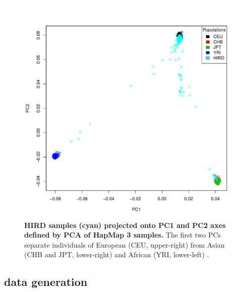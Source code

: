 \begin{figure}
    \includegraphics[width=1.0\textwidth]{mainmatter/figures/chapter_02/coreex_eQTLflu_20171204.gencall.smajor.impute_sex.qc3.pruned.hapmap_merged.flipped.pca.evec.pdf}
    \caption{
        \textbf{\gls{HIRD} samples (cyan) projected onto \gls{PC}1 and \gls{PC}2 axes defined by \gls{PCA} of HapMap 3 samples.}
        The first two \glspl{PC} separate individuals of European (CEU, upper-right) from Asian (CHB and JPT, lower-right) and African (YRI, lower-left) .
    }
    \label{fig:hird_genotype_pca_withHapmap}
\end{figure}

\subsection{ data generation}

